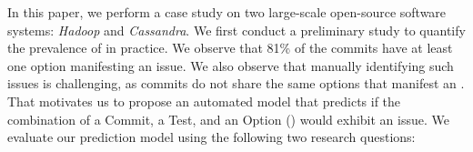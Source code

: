 
In this paper, we perform a case study on two large-scale open-source software systems: \emph{Hadoop} and \emph{Cassandra}. We first conduct a preliminary study to quantify the prevalence of \inconsistent in practice. We observe that 81\% of the commits have at least one option manifesting an \inconsistent issue. We also observe that manually identifying such issues is challenging, as commits do not share the same options that manifest an \inconsistent. That motivates us to propose an automated model that predicts if the combination of a Commit, a Test, and an Option (\textbf{\instance}) would exhibit an \inconsistent issue. We evaluate our prediction model using the following two research questions: 


